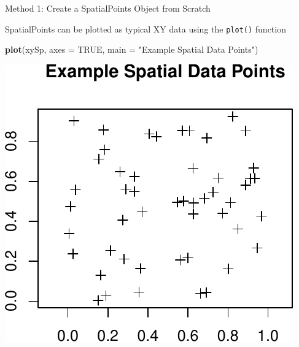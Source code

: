 \documentclass[10pt,ignorenonframetext,]{beamer}
\newenvironment{Shaded}{\begin{snugshade}}{\end{snugshade}}
\newcommand{\KeywordTok}[1]{\textcolor[rgb]{0.13,0.29,0.53}{\textbf{{#1}}}}
\newcommand{\DataTypeTok}[1]{\textcolor[rgb]{0.13,0.29,0.53}{{#1}}}
\newcommand{\StringTok}[1]{\textcolor[rgb]{0.31,0.60,0.02}{{#1}}}
\newcommand{\OtherTok}[1]{\textcolor[rgb]{0.56,0.35,0.01}{{#1}}}
\newcommand{\NormalTok}[1]{{#1}}
\begin{document}
\begin{frame}[fragile]{Method 1: Create a SpatialPoints Object from
Scratch}

SpatialPoints can be plotted as typical XY data using the
\texttt{plot()} function

\begin{Shaded}
\begin{Highlighting}[]
\KeywordTok{plot}\NormalTok{(xySp, }\DataTypeTok{axes =} \OtherTok{TRUE}\NormalTok{, }\DataTypeTok{main =} \StringTok{"Example Spatial Data Points"}\NormalTok{)}
\end{Highlighting}
\end{Shaded}

\begin{center}\includegraphics[width=0.5\linewidth]{SpatialDataLecture_files/figure-beamer/plotxy-1} \end{center}

\end{frame}
\end{document}
